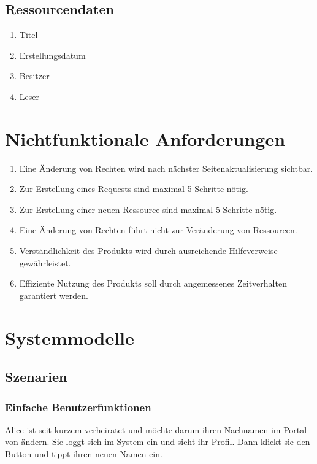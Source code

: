 \documentclass[parskip=full,11pt]{scrartcl}
\def\threedigits#1{%
  \ifnum#1<10 0\fi
  \ifnum#1<1 0\fi
  \number#1}
\begin{document}
\subsection{Ressourcendaten}
\begin{enumerate}[label={\textbf{/D\protect\threedigits{\theenumi}0/}}, leftmargin=*, resume]
		\item Titel
		\item Erstellungsdatum
		\item Besitzer
        	\item Leser     
\end{enumerate}

\newpage
\section{Nichtfunktionale Anforderungen}
\begin{enumerate}[label={\textbf{/NF\protect\threedigits{\theenumi}0/}}, leftmargin=*]
\item Eine Änderung von Rechten wird nach nächster Seitenaktualisierung sichtbar.
\item Zur Erstellung eines Requests sind maximal 5 Schritte nötig.
\item Zur Erstellung einer neuen Ressource sind maximal 5 Schritte nötig.
\item Eine Änderung von Rechten führt nicht zur Veränderung von Ressourcen.
\item Verständlichkeit des Produkts wird durch ausreichende Hilfeverweise gewährleistet.
\item Effiziente Nutzung des Produkts soll durch angemessenes Zeitverhalten garantiert werden.  
\end{enumerate}

\section{Systemmodelle}

\subsection{Szenarien}
\subsubsection*{Einfache Benutzerfunktionen}
Alice ist seit kurzem verheiratet und möchte darum ihren Nachnamen im Portal von \grqq \: ändern. Sie loggt sich im System ein und sieht ihr Profil. Dann klickt sie den Button \grqq \: und tippt ihren neuen Namen ein. 
\end{document}
